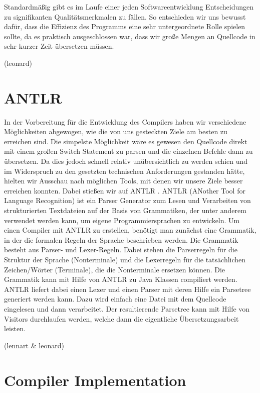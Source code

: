 \documentclass[paper=a4,fontsize=12pt,twocolumn]{scrreprt}
\begin{document}
Standardmäßig gibt es im Laufe einer jeden Softwareentwicklung Entscheidungen zu signifikanten Qualitätsmerkmalen zu fällen.
So entschieden wir uns bewusst dafür, dass die Effizienz des Programms eine sehr untergeordnete Rolle spielen sollte, da es praktisch ausgeschlossen war, dass wir große Mengen an Quellcode in sehr kurzer Zeit übersetzen müssen.

(leonard)

\section{ANTLR}
\label{sec:antlr}

In der Vorbereitung für die Entwicklung des Compilers haben wir verschiedene Möglichkeiten abgewogen, wie die von uns gesteckten Ziele am besten zu erreichen sind.
Die simpelste Möglichkeit wäre es gewesen den Quellcode direkt mit einem großen Switch Statement zu parsen und die einzelnen Befehle dann zu übersetzen.
Da dies jedoch schnell relativ unübersichtlich zu werden schien und im Widerspruch zu den gesetzten technischen Anforderungen gestanden hätte, hielten wir Ausschau nach möglichen Tools, mit denen wir unsere Ziele besser erreichen konnten.
Dabei stießen wir auf ANTLR \autocite{ANTLR}.
ANTLR (ANother Tool for Language Recognition) ist ein Parser Generator zum Lesen und Verarbeiten von strukturierten Textdateien auf der Basis von Grammatiken, der unter anderem verwendet werden kann, um eigene Programmiersprachen zu entwickeln.
Um einen Compiler mit ANTLR zu erstellen, benötigt man zunächst eine Grammatik, in der die formalen Regeln der Sprache beschrieben werden.
Die Grammatik besteht aus Parser- und Lexer-Regeln.
Dabei stehen die Parserregeln für die Struktur der Sprache (Nonterminale) und die Lexerregeln für die tatsächlichen Zeichen/Wörter (Terminale), die die Nonterminale ersetzen können.
Die Grammatik kann mit Hilfe von ANTLR zu Java Klassen compiliert werden.
ANTLR liefert dabei einen Lexer und einen Parser mit deren Hilfe ein Parsetree generiert werden kann.
Dazu wird einfach eine Datei mit dem Quellcode eingelesen und dann verarbeitet.
Der resultierende Parsetree kann mit Hilfe von Visitors durchlaufen werden,
welche dann die eigentliche Übersetzungsarbeit leisten.

(lennart \& leonard)


\section{Compiler Implementation}
\label{sec:compiler_implementation}
\end{document}
